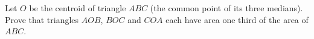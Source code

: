 Let $O$ be the centroid of triangle $ABC$ (the common point of its three medians). Prove that triangles $AOB$, $BOC$ and $COA$ each have area one third of the area of $ABC$.
